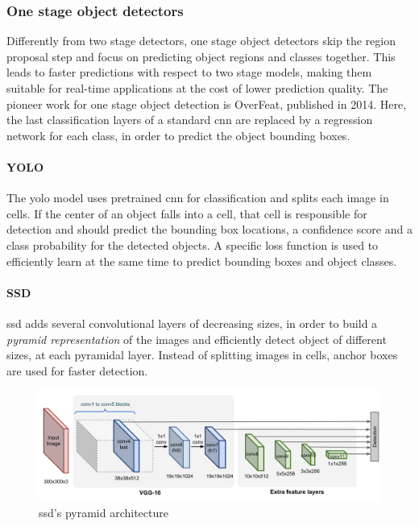 \documentclass[%
    corpo=12pt,
    twoside,
    stile=classica,   
    tipotesi=magistrale,
    evenboxes,
    english
]{toptesi}
\begin{document}
\subsubsection{One stage object detectors}
Differently from two stage detectors, one stage object detectors skip the region proposal step and focus on predicting object regions and classes together. This leads to faster predictions with respect to two stage models, making them suitable for real-time applications at the cost of lower prediction quality. The pioneer work for one stage object detection is OverFeat\cite{sermanet2014overfeat}, published in 2014. Here, the last classification layers of a standard \gls{cnn} are replaced by a regression network for each class, in order to predict the object bounding boxes.

\paragraph{YOLO}\label{sec:yolo}
The \acrfull{yolo} model\cite{redmon2016look} uses pretrained \gls{cnn} for classification and splits each image in cells. If the center of an object falls into a cell, that cell is responsible for detection and should predict the bounding box locations, a confidence score and a class probability for the detected objects. A specific loss function is used to efficiently learn at the same time to predict bounding boxes and object classes.

\paragraph{SSD}
\acrfull{ssd}\cite{Liu_2016} adds several convolutional layers of decreasing sizes, in order to build a \textit{pyramid representation} of the images and efficiently detect object of different sizes, at each pyramidal layer. Instead of splitting images in cells, anchor boxes are used for faster detection.

\begin{figure}
	\centering
	\includegraphics[width=.7\linewidth]{imgs/SSD-architecture.png}
	\caption{\acrshort{ssd}'s pyramid architecture\cite{objdetpart4}}
	\label{fig:ssd}
\end{figure}
\end{document}
